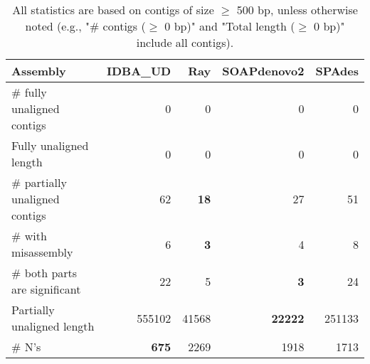 \documentclass[12pt,a4paper]{article}
\begin{document}
\begin{table}[ht]
\begin{center}
\caption{All statistics are based on contigs of size $\geq$ 500 bp, unless otherwise noted (e.g., "\# contigs ($\geq$ 0 bp)" and "Total length ($\geq$ 0 bp)" include all contigs).}
\begin{tabular}{|l*{4}{|r}|}
\hline
Assembly & IDBA\_UD & Ray & SOAPdenovo2 & SPAdes \\ \hline
\# fully unaligned contigs & 0 & 0 & 0 & 0 \\ \hline
Fully unaligned length & 0 & 0 & 0 & 0 \\ \hline
\# partially unaligned contigs & 62 & {\bf 18} & 27 & 51 \\ \hline
\hspace{5mm}\# with misassembly & 6 & {\bf 3} & 4 & 8 \\ \hline
\hspace{5mm}\# both parts are significant & 22 & 5 & {\bf 3} & 24 \\ \hline
Partially unaligned length & 555102 & 41568 & {\bf 22222} & 251133 \\ \hline
\# N's & {\bf 675} & 2269 & 1918 & 1713 \\ \hline
\end{tabular}
\end{center}
\end{table}
\end{document}
